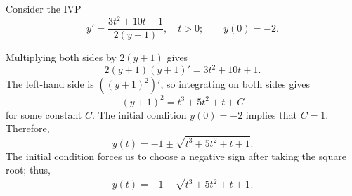 \documentclass{homework}
\begin{document}
	Consider the IVP
	\begin{equation}
		y' = \frac{3t^2+10t+1}{2(y+1)}, \quad t > 0; \qquad y(0) = -2.
	\end{equation}
	
	\begin{arabicparts}
		\questionpart Multiplying both sides by $2(y+1)$ gives
		\begin{equation}
			2(y+1)(y+1)' = 3t^2+10t+1.
		\end{equation}
		The left-hand side is $\left((y+1)^2\right)'$, so integrating on both sides gives
		\begin{equation}
			(y+1)^2 = t^3+5t^2+t+C
		\end{equation}
		for some constant $C$. The initial condition $y(0) = -2$ implies that $C = 1$. Therefore,
		\begin{equation}
			y(t) = -1 \pm \sqrt{t^3+5t^2+t+1}.
		\end{equation}
		The initial condition forces us to choose a negative sign after taking the square root; thus,
		\begin{equation}
			y(t) = -1 - \sqrt{t^3+5t^2+t+1}.
		\end{equation}
		

\end{arabicparts}
\end{document}
